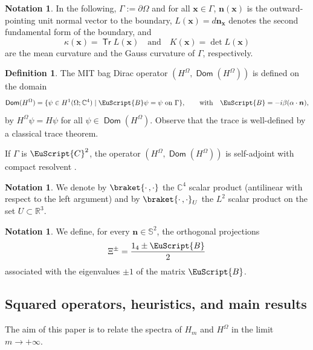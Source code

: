 \documentclass[JEP,XML,SOM,Unicode]{cedram}
\let\mathcal \EuScript
\newcommand{\cB}{\mathcal{B}}
\newcommand{\cC}{\mathcal{C}}
\DeclareMathOperator{\Tr}{\mathsf{Tr}}
\let\sep\mid
\theoremstyle{plain}
\theoremstyle{definition}
\newtheorem{notation}[theorem]{Notation}
\newtheorem{definition}[theorem]{Definition}
\newcommand{\RR}{\mathbb{R}}
\newcommand{\CC}{\mathbb{C}}
\newcommand{\bn}{{\boldsymbol n}}
\newcommand{\bx}{{\boldsymbol x}}
\let\pa\partial
\DeclareMathOperator{\Dom}{\mathsf{Dom}}
\begin{document}
\begin{notation}\label{not.def1}
In the following, $\Gamma := \pa \Omega$ and for all $\bx\in\Gamma$, $\bn(\bx)$ is the outward-pointing unit normal vector to the boundary, $L(\bx)=d\bn_{\bx}$ denotes the second fundamental form of the boundary, and
\begin{equation*}
\kappa(\bx)=\Tr L(\bx) \quad\text{and}\quad K(\bx) = \det L(\bx)
\end{equation*}
are the mean curvature and the Gauss curvature of $\Gamma$, respectively.
\end{notation}

\begin{definition}\label{def.MIT}
The MIT bag Dirac operator $(H^\Omega,\Dom(H^\Omega))$ is defined on the domain
\[
\Dom(H^\Omega) = \{\psi\in H^1(\Omega;\mathbb{C}^4)\sep\cB\psi = \psi~\text{on}~\Gamma\},\qquad\mbox{with}\quad\cB=-i\beta(\alpha\cdot \bn),
\]
by $H^\Omega\psi=H\psi$ for all $\psi\in\Dom(H^\Omega)$. Observe that the trace is well-defined by a classical trace theorem.

If $\Gamma$ is $\cC^2$, the operator $(H^\Omega,\Dom(H^\Omega))$ is self-adjoint with compact resolvent \cite{OBV17,ALR17SA,booss2009calderon,benguria2016spectral,BB12}.
\end{definition}
\begin{notation}
We denote by $\braket{\cdot\,,\cdot}$ the $\CC^4$ scalar product (antilinear with respect to the left argument) and by $\braket{\cdot\,,\cdot}_{U}$ the $L^2$ scalar product on the set $U\subset\RR^3$.
\end{notation}

\begin{notation}
We define, for every $\bn\in \mathbb{S}^2$, the orthogonal projections
\begin{equation}\label{eq:boundary_projections}
\Xi^\pm = \frac{1_4\pm\cB}{2}
\end{equation}
associated with the eigenvalues $\pm1$ of the matrix $\cB$.
\end{notation}

\subsection{Squared operators, heuristics, and main results}
The aim of this paper is to relate the spectra of $H_{m}$ and $H^\Omega$ in the limit $m\to+\infty$.
\end{document}
